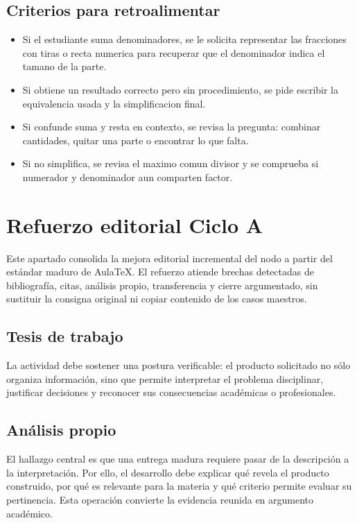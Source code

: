 \documentclass[
	spanish,
	letterpaper, oneside
]{article}
\begin{document}
\subsection{Criterios para retroalimentar}

\begin{itemize}
	\item Si el estudiante suma denominadores, se le solicita representar las fracciones con tiras o recta numerica para recuperar que el denominador indica el tamano de la parte.
	\item Si obtiene un resultado correcto pero sin procedimiento, se pide escribir la equivalencia usada y la simplificacion final.
	\item Si confunde suma y resta en contexto, se revisa la pregunta: combinar cantidades, quitar una parte o encontrar lo que falta.
	\item Si no simplifica, se revisa el maximo comun divisor y se comprueba si numerador y denominador aun comparten factor.
\end{itemize}

\section*{Refuerzo editorial Ciclo A}
Este apartado consolida la mejora editorial incremental del nodo a partir del estándar maduro de AulaTeX. El refuerzo atiende brechas detectadas de bibliografía, citas, análisis propio, transferencia y cierre argumentado, sin sustituir la consigna original ni copiar contenido de los casos maestros.

\subsection*{Tesis de trabajo}
La actividad debe sostener una postura verificable: el producto solicitado no sólo organiza información, sino que permite interpretar el problema disciplinar, justificar decisiones y reconocer sus consecuencias académicas o profesionales.

\subsection*{Análisis propio}
El hallazgo central es que una entrega madura requiere pasar de la descripción a la interpretación. Por ello, el desarrollo debe explicar qué revela el producto construido, por qué es relevante para la materia y qué criterio permite evaluar su pertinencia. Esta operación convierte la evidencia reunida en argumento académico.
\end{document}
